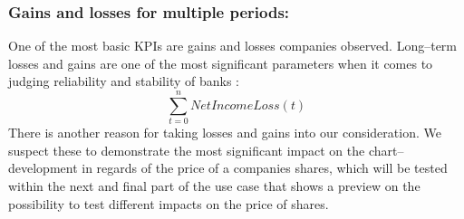 \documentclass[runningheads]{llncs}
\begin{document}
\subsubsection{Gains and losses for multiple periods:}
One of the most basic KPIs are gains and losses companies observed. Long--term losses and gains are one of the most significant parameters when it comes to judging reliability and stability of banks \cite{AlGa09}:
\begin{equation}
\sum_{t=0}^{n}NetIncomeLoss(t)
\end{equation}
There is another reason for taking losses and gains into our consideration. We suspect these to demonstrate the most significant impact on the chart--development in regards of the price of a companies shares, which will be tested within the next and final part of the use case that shows a preview on the possibility to test different impacts on the price of shares.
\end{document}

